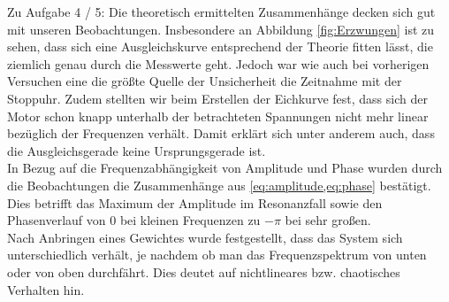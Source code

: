 Zu Aufgabe 4 / 5:
Die theoretisch ermittelten Zusammenhänge decken sich gut mit unseren Beobachtungen. Insbesondere an Abbildung \ref{fig:Erzwungen} ist zu sehen, dass sich eine Ausgleichskurve entsprechend der Theorie fitten lässt, die ziemlich genau durch die Messwerte geht. Jedoch war wie auch bei vorherigen Versuchen eine die größte Quelle der Unsicherheit die Zeitnahme mit der Stoppuhr. Zudem stellten wir beim Erstellen der Eichkurve fest, dass sich der Motor schon knapp unterhalb der betrachteten Spannungen nicht mehr linear bezüglich der Frequenzen verhält. Damit erklärt sich unter anderem auch, dass die Ausgleichsgerade keine Ursprungsgerade ist.\\

In Bezug auf die Frequenzabhängigkeit von Amplitude und Phase wurden durch die Beobachtungen die Zusammenhänge aus \cref{eq:amplitude,eq:phase} bestätigt. Dies betrifft das Maximum der Amplitude im Resonanzfall sowie den Phasenverlauf von 0 bei kleinen Frequenzen zu $-\pi$ bei sehr großen. \\

Nach Anbringen eines Gewichtes wurde festgestellt, dass das System sich unterschiedlich verhält, je nachdem ob man das Frequenzspektrum von unten oder von oben durchfährt. Dies deutet auf nichtlineares bzw. chaotisches Verhalten hin.
